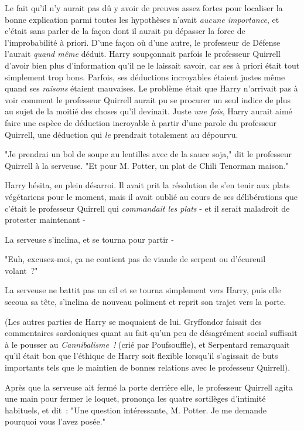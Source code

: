 Le fait qu'il n'y aurait pas dû y avoir de preuves assez fortes pour localiser la bonne explication parmi toutes les hypothèses n'avait \emph{aucune importance}, et c'était sans parler de la façon dont il aurait pu dépasser la force de l'improbabilité à priori. D'une façon où d'une autre, le professeur de Défense l'aurait \emph{quand même} déduit. Harry soupçonnait parfois le professeur Quirrell d'avoir bien plus d'information qu'il ne le laissait savoir, car ses à priori était tout simplement trop bons. Parfois, ses déductions incroyables étaient justes même quand ses \emph{raisons} étaient mauvaises. Le problème était que Harry n'arrivait pas à voir comment le professeur Quirrell aurait pu se procurer un seul indice de plus au sujet de la moitié des choses qu'il devinait. Juste \emph{une fois}, Harry aurait aimé faire une espèce de déduction incroyable à partir d'une parole du professeur Quirrell, une déduction qui \emph{le} prendrait totalement au dépourvu.

\later

"Je prendrai un bol de soupe au lentilles avec de la sauce soja," dit le professeur Quirrell à la serveuse. "Et pour M. Potter, un plat de Chili Tenorman maison."

Harry hésita, en plein désarroi. Il avait prit la résolution de s'en tenir aux plats végétariens pour le moment, mais il avait oublié au cours de ses délibérations que c'était le professeur Quirrell qui \emph{commandait les plats} - et il serait maladroit de protester maintenant -

La serveuse s'inclina, et se tourna pour partir -

"Euh, excusez-moi, ça ne contient pas de viande de serpent ou d'écureuil volant~?"

La serveuse ne battit pas un cil et se tourna simplement vers Harry, puis elle secoua sa tête, s'inclina de nouveau poliment et reprit son trajet vers la porte.

(Les autres parties de Harry se moquaient de lui. Gryffondor faisait des commentaires sardoniques quant au fait qu'un peu de désagrément social suffisait à le pousser au \emph{Cannibalisme~!} (crié par Poufsouffle), et Serpentard remarquait qu'il était bon que l'éthique de Harry soit flexible lorsqu'il s'agissait de buts importants tels que le maintien de bonnes relations avec le professeur Quirrell).

Après que la serveuse ait fermé la porte derrière elle, le professeur Quirrell agita une main pour fermer le loquet, prononça les quatre sortilèges d'intimité habituels, et dit~: "Une question intéressante, M. Potter. Je me demande pourquoi vous l'avez posée."

